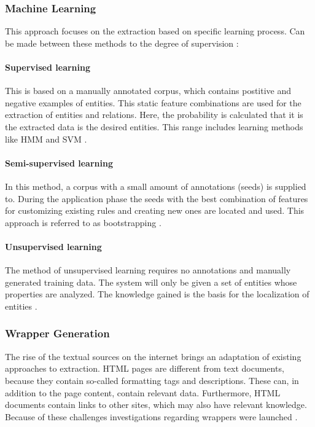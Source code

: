 \subsubsection{Machine Learning}
This approach focuses on the extraction based on specific learning process. Can be made between these methods to the degree of supervision \cite{Carstensen:2010}\cite{Schramm:2008}:

\paragraph{Supervised learning}
This is based on a manually annotated corpus, which contains postitive and negative examples of entities. This static feature combinations are used for the extraction of entities and relations. Here, the probability is calculated that it is the extracted data is the desired entities. This range includes learning methods like \gls{HMM} and \gls{SVM} \cite{Schramm:2008}\cite{Siefkes:2005}\cite{Carstensen:2010}.

\paragraph{Semi-supervised learning}
In this method, a corpus with a small amount of annotations (seeds) is supplied to. During the application phase the seeds with the best combination of features for customizing existing rules and creating new ones are located and used. This approach is referred to as bootstrapping \cite{Carstensen:2010}\cite{Chang:2006}.

\paragraph{Unsupervised learning}
The method of unsupervised learning requires no annotations and manually generated training data. The system will only be given a set of entities whose properties are analyzed. The knowledge gained is the basis for the localization of entities \cite{Carstensen:2010}\cite{Schramm:2008}.

\subsubsection{Wrapper Generation}
The rise of the textual sources on the internet brings an adaptation of existing approaches to extraction. HTML pages are different from text documents, because they contain so-called formatting tags and descriptions. These can, in addition to the page content, contain relevant data. Furthermore, HTML documents contain links to other sites, which may also have relevant knowledge. Because of these challenges investigations regarding wrappers were launched  \cite{Eikvil:1999}\cite{Freitag:2000}\cite{Linsmayr:2010}.

